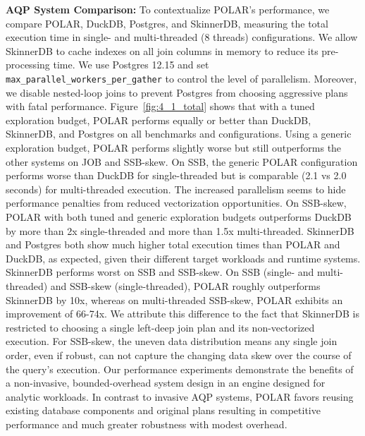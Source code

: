 \textbf{AQP System Comparison:} To contextualize POLAR's performance, we compare POLAR, DuckDB, Postgres, and SkinnerDB, measuring the total execution time in single- and multi-threaded (8 threads) configurations. We allow SkinnerDB to cache indexes on all join columns in memory to reduce its pre-processing time. We use Postgres 12.15 and set \texttt{max\_parallel\_workers\_per\_gather} to control the level of parallelism. Moreover, we disable nested-loop joins to prevent Postgres from choosing aggressive plans with fatal performance. Figure~\ref{fig:4_1_total} shows that with a tuned exploration budget, POLAR performs equally or better than DuckDB, SkinnerDB, and Postgres on all benchmarks and configurations. Using a generic exploration budget, POLAR performs slightly worse but still outperforms the other systems on JOB and SSB-skew. On SSB, the generic POLAR configuration performs worse than DuckDB for single-threaded but is comparable (2.1 vs 2.0 seconds) for multi-threaded execution. The increased parallelism seems to hide performance penalties from reduced vectorization opportunities. On SSB-skew, POLAR with both tuned and generic exploration budgets outperforms DuckDB by more than 2x single-threaded and more than 1.5x multi-threaded. SkinnerDB and Postgres both show much higher total execution times than POLAR and DuckDB, as expected, given their different target workloads and runtime systems. SkinnerDB performs worst on SSB and SSB-skew. On SSB (single- and multi-threaded) and SSB-skew (single-threaded), POLAR roughly outperforms SkinnerDB by 10x, whereas on multi-threaded SSB-skew, POLAR exhibits an improvement of 66-74x. We attribute this difference to the fact that SkinnerDB is restricted to choosing a single left-deep join plan and its non-vectorized execution. For SSB-skew, the uneven data distribution means any single join order, even if robust, can not capture the changing data skew over the course of the query's execution. Our performance experiments demonstrate the benefits of a non-invasive, bounded-overhead system design in an engine designed for analytic workloads. In contrast to invasive AQP systems, POLAR favors reusing existing database components and original plans resulting in competitive performance and much greater robustness with modest overhead.
